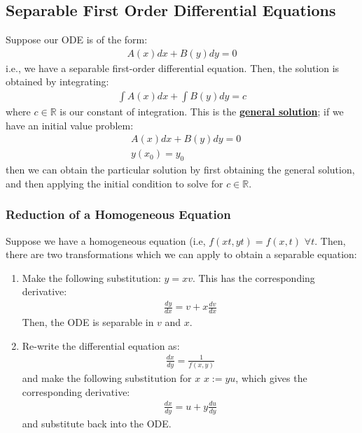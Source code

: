 \documentclass[11pt]{article}
\newcommand{\dfn}[1]{\underline{\textbf{#1}}}
\newcommand{\R}[0]{\mathbb{R}}
\begin{document}
\subsection{Separable First Order Differential Equations}
Suppose our ODE is of the form: 
\begin{align}
	A(x) dx + B(y) dy = 0 	
\end{align}
i.e., we have a separable first-order differential equation. Then, the solution is obtained by integrating: 
\begin{align}
	\int A(x) dx + \int B(y) dy = c	
\end{align}
where $c \in \R$ is our constant of integration. This is the \dfn{general solution}; if we have an initial value problem: 
\begin{align*}
	& A(x) dx + B(y) dy = 0 	 \\
	& y(x_0) = y_0 
\end{align*} 
then we can obtain the particular solution by first obtaining the general solution, and then applying the initial condition to solve for $c \in \R$.
\subsubsection{Reduction of a Homogeneous Equation}
Suppose we have a homogeneous equation (i.e, $f(xt , yt) = f(x,t)$ $\forall t$. Then, there are two transformations which we can apply to obtain a separable equation: 
\begin{enumerate}[noitemsep]
	\item Make the following substitution: $y = xv$. This has the corresponding derivative:
	\begin{align}
		\frac{dy}{dx} = v + x \frac{dv}{dx}	
	\end{align}
	Then, the ODE is separable in $v$ and $x$. 
	\item Re-write the differential equation as:
	\begin{align}
		\frac{dx}{dy} = \frac{1}{f(x,y)}	
	\end{align}
	and make the following substitution for $x$ $x:= yu$, which gives the corresponding derivative: 
	\begin{align*}
		\frac{dx}{dy} = u + y \frac{du}{dy}
	\end{align*}
	and substitute back into the ODE. 
\end{enumerate}
\end{document}
